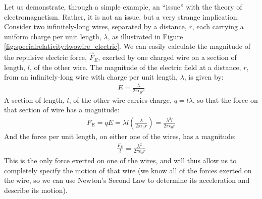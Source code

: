 Let us demonstrate, through a simple example, an ``issue'' with the theory of electromagnetism. Rather, it is not an issue, but a very strange implication. Consider two infinitely-long wires, separated by a distance, $r$, each carrying a uniform charge per unit length, $\lambda$, as illustrated in Figure \ref{fig:specialrelativity:twowire_electric}. 
We can easily calculate the magnitude of the repulsive electric force, $\vec F_E$, exerted by one charged wire on a section of length, $l$, of the other wire. The magnitude of the electric field at a distance, $r$, from an infinitely-long wire with charge per unit length, $\lambda$, is given by:
\begin{align*}
E = \frac{\lambda}{2\pi \epsilon_0r}
\end{align*}
A section of length, $l$, of the other wire carries charge, $q=l\lambda$, so that the force on that section of wire has a magnitude:
\begin{align*}
F_E=qE=\lambda l \left( \frac{\lambda}{2\pi \epsilon_0r}\right) = \frac{\lambda^2 l}{2\pi \epsilon_0r}
\end{align*}
And the force per unit length, on either one of the wires, has a magnitude:
\begin{align*}
\frac{F_E}{l}=\frac{\lambda^2}{2\pi \epsilon_0r}
\end{align*}
This is the only force exerted on one of the wires, and will thus allow us to completely specify the motion of that wire (we know all of the forces exerted on the wire, so we can use Newton's Second Law to determine its acceleration and describe its motion).

